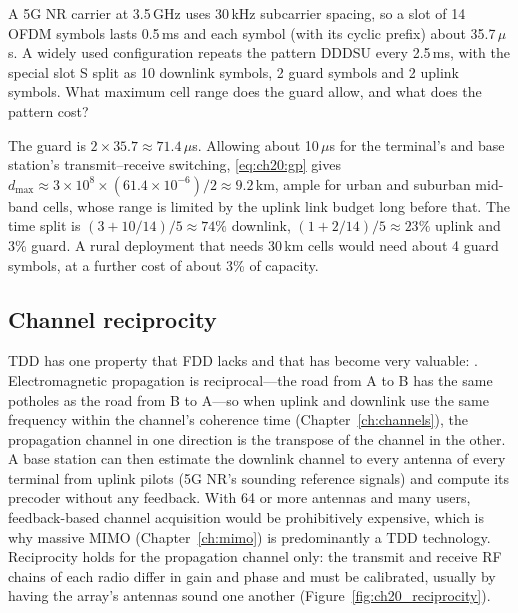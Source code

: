 
\begin{worked}
A 5G NR carrier at 3.5\,GHz uses 30\,kHz subcarrier spacing, so a slot of 14 OFDM symbols lasts
0.5\,ms and each symbol (with its cyclic prefix) about 35.7\,$\mu$s. A widely used configuration
repeats the pattern DDDSU every 2.5\,ms, with the special slot S split as 10 downlink symbols,
2 guard symbols and 2 uplink symbols. What maximum cell range does the guard allow, and what
does the pattern cost?

The guard is $2\times35.7\approx71.4\,\mu$s. Allowing about 10\,$\mu$s for the terminal's and
base station's transmit--receive switching, \eqref{eq:ch20:gp} gives
$d_{\max}\approx3\times10^8\times(61.4\times10^{-6})/2\approx9.2$\,km, ample for urban and
suburban mid-band cells, whose range is limited by the uplink link budget long before that. The
time split is $(3+10/14)/5\approx74\%$ downlink, $(1+2/14)/5\approx23\%$ uplink and 3\% guard. A
rural deployment that needs 30\,km cells would need about 4 guard symbols, at a further cost of
about 3\% of capacity.
\end{worked}

\subsection{Channel reciprocity}

TDD has one property that FDD lacks and that has become very valuable: .
Electromagnetic propagation is reciprocal---the road from A to B has the same potholes as the road
from B to A---so when uplink and downlink use the same frequency within the channel's coherence time
(Chapter~\ref{ch:channels}), the propagation channel in one direction is the transpose of the channel
in the other. A base station can then estimate the downlink channel to every antenna of every terminal
from uplink pilots (5G NR's sounding reference signals) and compute its precoder without any feedback.
With 64 or more antennas and many users, feedback-based channel acquisition would be prohibitively
expensive, which is why massive MIMO (Chapter~\ref{ch:mimo}) is predominantly a TDD technology.
Reciprocity holds for the propagation channel only: the transmit and receive RF chains of each radio
differ in gain and phase and must be calibrated, usually by having the array's antennas sound one another
(Figure~\ref{fig:ch20_reciprocity}).

